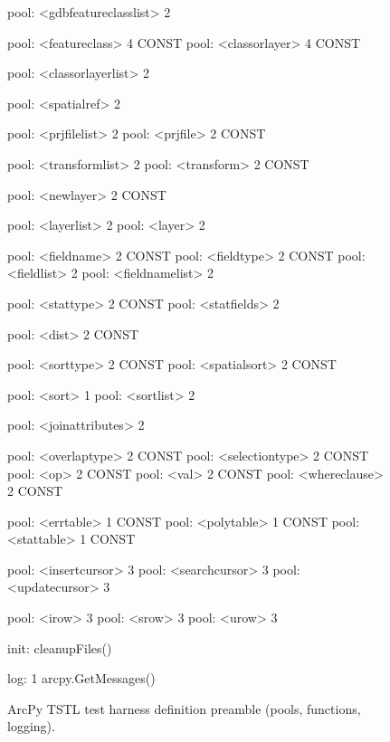 \begin{figure}
{\begin{code}
pool: <gdbfeatureclasslist> 2

pool: <featureclass> 4 CONST
pool: <classorlayer> 4 CONST

pool: <classorlayerlist> 2

pool: <spatialref> 2

pool: <prjfilelist> 2
pool: <prjfile> 2 CONST

pool: <transformlist> 2
pool: <transform> 2 CONST

pool: <newlayer> 2 CONST

pool: <layerlist> 2
pool: <layer> 2

pool: <fieldname> 2 CONST
pool: <fieldtype> 2 CONST
pool: <fieldlist> 2
pool: <fieldnamelist> 2

pool: <stattype> 2 CONST
pool: <statfields> 2

pool: <dist> 2 CONST

pool: <sorttype> 2 CONST
pool: <spatialsort> 2 CONST

pool: <sort> 1
pool: <sortlist> 2

pool: <joinattributes> 2

pool: <overlaptype> 2 CONST
pool: <selectiontype> 2 CONST
pool: <op> 2 CONST
pool: <val> 2 CONST
pool: <whereclause> 2 CONST

pool: <errtable> 1 CONST
pool: <polytable> 1 CONST
pool: <stattable> 1 CONST

pool: <insertcursor> 3
pool: <searchcursor> 3
pool: <updatecursor> 3

pool: <irow> 3
pool: <srow> 3
pool: <urow> 3

init: cleanupFiles()

log: 1 arcpy.GetMessages()
\end{code}
}
\caption{ArcPy TSTL test harness definition preamble (pools, functions, logging).}
\label{preamble}
\end{figure}

